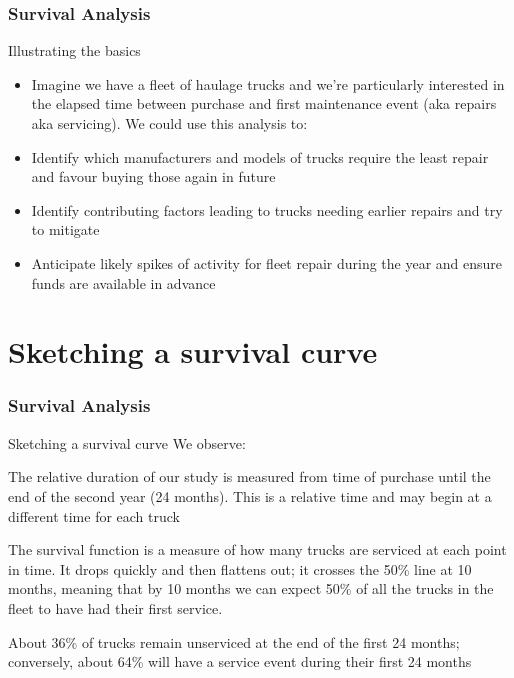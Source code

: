\documentclass[]{beamer}
\begin{document}
	\begin{frame}
		\frametitle{Survival Analysis}
		Illustrating the basics
		\begin{itemize}
			\item Imagine we have a fleet of haulage trucks and we're particularly interested in the elapsed time between purchase and first maintenance event (aka repairs aka servicing). We could use this analysis to:
			
			\item Identify which manufacturers and models of trucks require the least repair and favour buying those again in future
			
			\item Identify contributing factors leading to trucks needing earlier repairs and try to mitigate
			
			\item Anticipate likely spikes of activity for fleet repair during the year and ensure funds are available in advance
			
		\end{itemize}
		
	\end{frame}
	\section{Sketching a survival curve}
	\begin{frame}
		\frametitle{Survival Analysis}
		Sketching a survival curve
		We observe:
		
		The relative duration of our study is measured from time of purchase until the end of the second year (24 months). This is a relative time and may begin at a different time for each truck
		
		The survival function is a measure of how many trucks are serviced at each point in time. It drops quickly and then flattens out; it crosses the 50\% line at 10 months, meaning that by 10 months we can expect 50\% of all the trucks in the fleet to have had their first service.
		
		About 36\% of trucks remain unserviced at the end of the first 24 months; conversely, about 64\% will have a service event during their first 24 months
	\end{frame}
\end{document}
